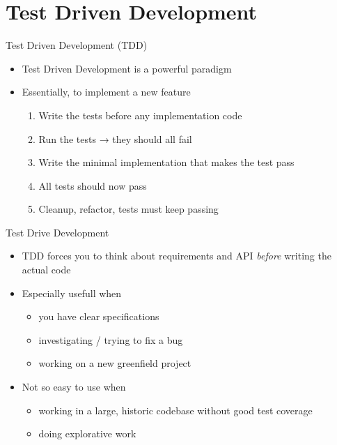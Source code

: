 \section{Test Driven Development}

\begin{frame}[c]{Test Driven Development (TDD)}
  \begin{itemize}
    \item Test Driven Development is a powerful paradigm
    \item Essentially, to implement a new feature
      \begin{enumerate}
        \item Write the tests before any implementation code
        \item Run the tests → they should all fail
        \item Write the minimal implementation that makes the test pass
        \item All tests should now pass
        \item Cleanup, refactor, tests must keep passing
      \end{enumerate}
  \end{itemize}
\end{frame}

\begin{frame}[c]{Test Drive Development}
  \begin{itemize}
    \item TDD forces you to think about requirements and API \emph{before} writing the actual code
    \item Especially usefull when
      \begin{itemize}
        \item you have clear specifications
        \item investigating / trying to fix a bug
        \item working on a new greenfield project
      \end{itemize}
    \item Not so easy to use when
      \begin{itemize}
        \item working in a large, historic codebase without good test coverage
        \item doing explorative work
      \end{itemize}
  \end{itemize}
\end{frame}

